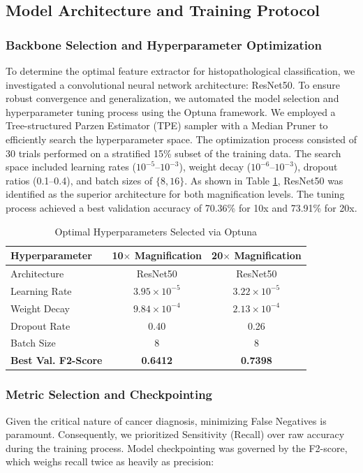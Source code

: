 \documentclass[runningheads]{llncs}
\begin{document}
\subsection{Model Architecture and Training Protocol}

\subsubsection{Backbone Selection and Hyperparameter Optimization}
To determine the optimal feature extractor for histopathological classification, we investigated a convolutional neural network architecture: ResNet50. To ensure robust convergence and generalization, we automated the model selection and hyperparameter tuning process using the Optuna framework. We employed a Tree-structured Parzen Estimator (TPE) sampler with a Median Pruner to efficiently search the hyperparameter space. The optimization process consisted of 30 trials performed on a stratified 15\% subset of the training data. The search space included learning rates ($10^{-5}$--$10^{-3}$), weight decay ($10^{-6}$--$10^{-3}$), dropout ratios (0.1--0.4), and batch sizes of $\{8, 16\}$. As shown in Table \ref{tab:hyperparams}, ResNet50 was identified as the superior architecture for both magnification levels. The tuning process achieved a best validation accuracy of 70.36\% for 10x and 73.91\% for 20x.

\begin{table}[H]
\caption{Optimal Hyperparameters Selected via Optuna}
\begin{center}
\begin{tabular}{lcc}
\toprule
\textbf{Hyperparameter} & \textbf{10$\times$ Magnification} & \textbf{20$\times$ Magnification} \\
\midrule
Architecture & ResNet50 & ResNet50 \\
Learning Rate & $3.95 \times 10^{-5}$ & $3.22 \times 10^{-5}$ \\
Weight Decay & $9.84 \times 10^{-4}$ & $2.13 \times 10^{-4}$ \\
Dropout Rate & 0.40 & 0.26 \\
Batch Size & 8 & 8 \\
\midrule
\textbf{Best Val. F2-Score} & \textbf{0.6412} & \textbf{0.7398} \\
\bottomrule
\end{tabular}
\label{tab:hyperparams}
\end{center}
\end{table}

\subsubsection{Metric Selection and Checkpointing}
Given the critical nature of cancer diagnosis, minimizing False Negatives is paramount. Consequently, we prioritized Sensitivity (Recall) over raw accuracy during the training process. Model checkpointing was governed by the F2-score, which weighs recall twice as heavily as precision:
\end{document}

